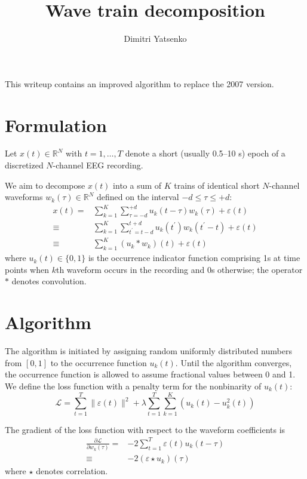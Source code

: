 \documentclass[10pt,twocolumn]{article}
\title{Wave train decomposition}
\author{Dimitri Yatsenko}
\newcommand{\R}{\mathbb R}
\begin{document}
\maketitle
This writeup contains an improved algorithm to replace the 2007 version. 

\section*{Formulation}
Let $x(t)\in \R^N$ with $t = 1,\ldots,T$ denote a short (usually 0.5--10 s) epoch of a discretized $N$-channel EEG recording.

We aim to decompose $x(t)$ into a sum of $K$ trains of identical short $N$-channel waveforms $w_k(\tau)\in \R^N$ defined on the interval $-d \le \tau \le +d$:
\begin{equation}
\begin{split}
x(t) = & 
\sum\limits_{k=1}^K \sum_{\tau=-d}^{+d} u_k(t-\tau)w_k(\tau) + \varepsilon(t)
\\
\equiv &
\sum\limits_{k=1}^K \sum_{t^\prime=t-d}^{t+d} u_k(t^\prime)w_k(t^\prime-t) + \varepsilon(t)
\\
\equiv &
\sum\limits_{k=1}^K (u_k*w_k)(t) + \varepsilon(t)
\end{split}
\end{equation}
where $u_k(t)\in \{0,1\}$ is the occurrence indicator function comprising 1s at time points when $k$th waveform occurs in the recording and 0s otherwise; the operator $*$ denotes convolution.

\section*{Algorithm}
The algorithm is initiated by assigning random uniformly distributed numbers from $[0,1]$ to the occurrence function $u_k(t)$. 
Until the algorithm converges, the occurrence function is allowed to assume fractional values between 0 and 1.
We define the loss function with a penalty term for the nonbinarity of $u_k(t)$:
\begin{equation}
\mathcal L = 
\sum\limits_{t=1}^T \|\varepsilon(t)\|^2 
+ \lambda\sum\limits_{t=1}^T \sum\limits_{k=1}^K (u_k(t)-u_k^2(t)) 
\end{equation}

The gradient of the loss function with respect to the waveform coefficients is 
\begin{equation}
\begin{split}
\frac{\partial \mathcal L}{\partial w_k(\tau)} 
= & -2\sum\limits_{t=1}^T \varepsilon(t) u_k(t-\tau)
\\
\equiv & -2 (\varepsilon\star u_k)(\tau)
\end{split}
\end{equation}
where $\star$ denotes correlation.
\end{document}
